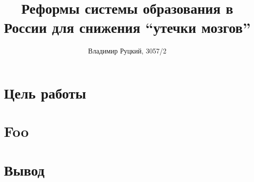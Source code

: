 \documentclass[10pt,a4paper,titlepage]{article}
\title{Реформы системы образования в России для снижения ``утечки мозгов''}
\author{Владимир Руцкий, 3057/2}
\begin{document}
\titlepage
\maketitle

\section*{Цель работы}
\section*{Foo}
\section*{Вывод}

\pagebreak
\begin{thebibliography}{99}
\end{thebibliography}
\end{document}
